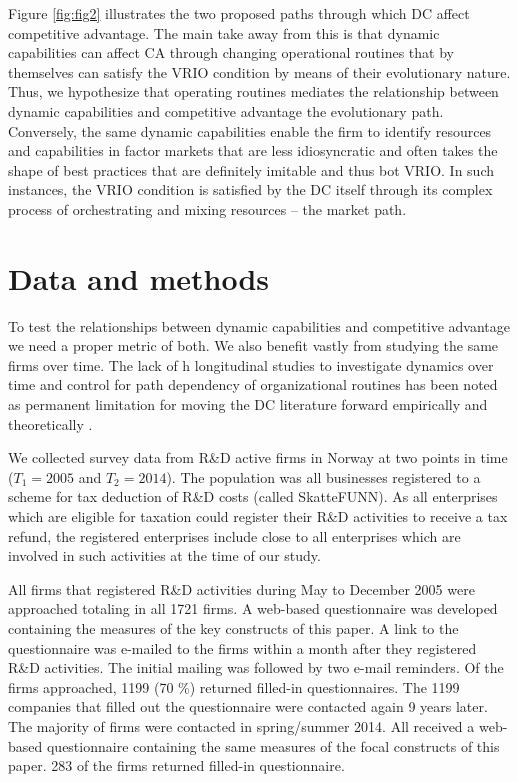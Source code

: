 \documentclass[review,fleqn]{elsarticle}\usepackage[]{graphicx}\usepackage[]{color}
\begin{document}
Figure \ref{fig:fig2} illustrates the two proposed paths through which DC affect
competitive advantage. The main take away from this is that dynamic capabilities can
affect CA through changing operational routines that by themselves can satisfy the VRIO
condition by means of their evolutionary nature. Thus, we hypothesize that operating
routines mediates the relationship between dynamic capabilities and competitive advantage
the evolutionary path. Conversely, the same dynamic capabilities enable the firm to
identify resources and capabilities in factor markets that are less idiosyncratic and
often takes the shape of best practices that are definitely imitable and thus bot VRIO. In
such instances, the VRIO condition is satisfied by the DC itself through its complex
process of orchestrating and mixing resources – the market path.


\section{Data and methods}

To test the relationships between dynamic capabilities and competitive advantage we need a
proper metric of both. We also benefit vastly from studying the same firms over time.  The
lack of h longitudinal studies to investigate dynamics over time and control for path
dependency of organizational routines has been noted as permanent limitation for moving
the DC literature forward empirically and theoretically \cite{Schilke2018}. 

We collected survey data from R\&D active firms in Norway at two points in time
($T_1=2005$ and $T_2=2014$). The population was all businesses registered to a scheme for
tax deduction of R\&D costs (called SkatteFUNN). As all enterprises which are eligible for
taxation could register their R\&D activities to receive a tax refund, the registered
enterprises include close to all enterprises which are involved in such activities at the
time of our study.

All firms that registered R\&D activities during May to December 2005 were approached
totaling in all 1721 firms. A web-based questionnaire was developed containing the
measures of the key constructs of this paper. A link to the questionnaire was e-mailed to
the firms within a month after they registered R\&D activities. The initial mailing was
followed by two e-mail reminders. Of the firms approached, 1199 (70 \%) returned filled-in
questionnaires. The 1199 companies that filled out the questionnaire were contacted again
9 years later. The majority of firms were contacted in spring/summer 2014. All received a
web-based questionnaire containing the same measures of the focal constructs of this
paper. 283 of the firms returned filled-in questionnaire.
\end{document}
